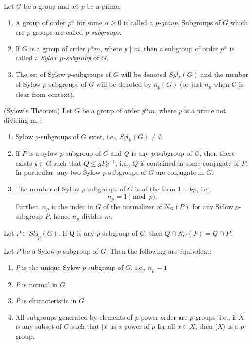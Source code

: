 \documentclass[../main]{subfiles}
\begin{document}
 
 \begin{dfn}
  Let $G$ be a group and let $p$ be a prime.
  \begin{enumerate}
   \item A group of order $p^\alpha$ for some $\alpha \geq 0$ is called a \textit{$p$-group}. Subgroups of $G$ which are $p$-groups are called \textit{$p$-subgroups}. 
   \item If $G$ is a group of order $p^\alpha m$, where $p\nmid m$, then a subgroup of order $p^\alpha$ is called a \textit{Sylow $p$-subgroup} of $G$.
   \item The set of Sylow $p$-subgroups of $G$ will be denoted $Syl_p(G)$ and the number of Sylow $p$-subgroups of $G $ will be denoted by $n_p(G)$ (or just $n_p$ when $G$ is clear from context).
  \end{enumerate}
 \end{dfn}
 
 
 \begin{thm}
  (Sylow's Theorem) Let $G$ be a group of order $p^\alpha m$, where $p$ is a prime not dividing m. ;
  \begin{enumerate}
   \item Sylow $p$-subgroups of $G$ exist, i.e., $Syl_p(G) \neq \emptyset$.
   \item If $P$ is a sylow $p$-subgroup of $G$ and $Q$ is any $p$-subgroup of $G$, then there exists $g \in G$ such that $Q \leq gPg^{-1}$, i.e., $Q$ is contained in some conjugate of $P$. In particular, any two  Sylow $p$-subgroups of $G$ are conjugate in $G$.
   \item The number of Sylow $p$-subgroups of $G$ is of the form $1+kp$, i.e., 
   \[n_p=1 \pmod{p}.\]
   Further, $n_p$ is the indec in $G$ of the normalizer of $N_G(P)$ for any Sylow $p$-subgroup $P$, hence $n_p$ divides $m$.
  \end{enumerate}
 \end{thm}
 
 
 \begin{lem}
  Let $P\in Sly_p(G)$. If Q is any $p$-subgroup of $G$, then $Q\cap N_G(P) = Q\cap P$.
 \end{lem}
 
 
 \begin{cor}
  Let $P$ be a Sylow $p$-subgroup of $G$. Then the following are equivalent:
  \begin{enumerate}
   \item $P$ is the unique Sylow $p$-subgroup of $G$, i.e., $n_p = 1$
   \item $P$ is normal in $G$
   \item $P$ is characteristic in $G$ 
   \item All subgroups generated by elements of $p$-power order are $p$-groups, i.e., if $X$ is any subset of $G$ such that $|x|$ is a power of $p$ for all $x\in X$, then $\langle X \rangle$ is a $p$-group.
  \end{enumerate}
 \end{cor}
 
\end{document}
